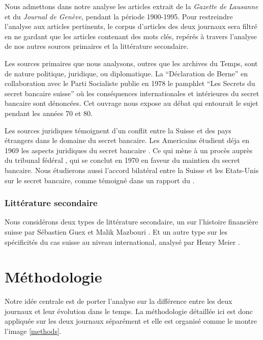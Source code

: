 \documentclass[a4paper, 11pt]{article}
\begin{document}
Nous admettons dans notre analyse les articles extrait de la \textit{Gazette de
Lausanne} et du \textit{Journal de Genève}, pendant la
période 1900-1995. Pour restreindre l’analyse aux articles pertinents, le corpus
d’articles des deux journaux sera filtré en ne gardant que les articles
contenant des mots clés, repérés à travers l’analyse de nos autres sources
primaires et la littérature secondaire.

Les sources primaires que nous analysons, outres que les archives du Temps, sont
de nature politique, juridique, ou diplomatique. La “Déclaration de Berne” en
collaboration avec le Parti Socialiste publie en 1978 le pamphlet “Les Secrets
du secret bancaire suisse” \citep{GiovanniniPierLuigi1978Lsds} où les
conséquences internationales et intérieures du secret bancaire sont dénoncées.
Cet ouvrage nous expose au débat qui entourait le sujet pendant les années 70 et
80.

Les sources juridiques témoignent d'un conflit entre la Suisse et des pays
étrangers dans le domaine du secret bancaire. Les Americains étudient déja en
1969 les aspects juridiques du secret bancaire \citep{Mueller69}. Ce qui mène à
un procès auprès du tribunal fédéral \citep{tribunalFederal70}, qui se conclut
en 1970 en faveur du maintien du secret bancaire. Nous étudierons aussi l'accord
bilatéral entre la Suisse et les Etats-Unis sur le secret bancaire, comme
témoigné dans un rapport du \citet{insiderTrading83}.

\subsubsection{Littérature secondaire}

Nous considérons deux types de littérature secondaire, un sur l’histoire financière
suisse par Sébastien Guex et Malik Mazbouri \citep{Guex99, Guex00, Mazbouri12}.
Et un autre type sur les spécificités du cas suisse au niveau international,
analysé par Henry Meier \citep{Meier12}.


\hypertarget{muxe9thodologie}{%
\section{Méthodologie}\label{muxe9thodologie}}

Notre idée centrale est de porter l'analyse sur la différence entre les
deux journaux et leur évolution dans le temps. La méthodologie détaillée
ici est donc appliquée sur les deux journaux séparément et elle est
organisé comme le montre l'image \ref{methods}.
\end{document}
